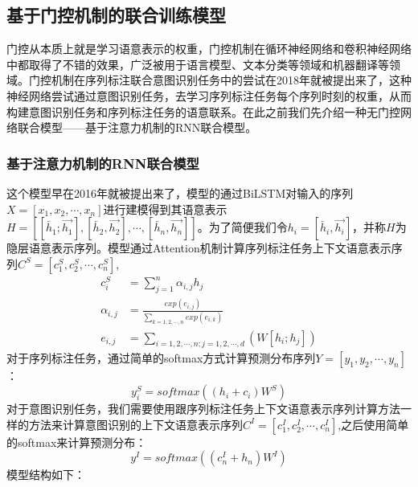 \documentclass[twoside,a4paper,12pt]{book}%
\begin{document}
\subsection{基于门控机制的联合训练模型}
门控从本质上就是学习语意表示的权重，门控机制在循环神经网络和卷积神经网络中都取得了不错的效果，广泛被用于语言模型、文本分类等领域和机器翻译等领域。门控机制在序列标注联合意图识别任务中的尝试在2018年就被提出来了，这种神经网络尝试通过意图识别任务，去学习序列标注任务每个序列时刻的权重，从而构建意图识别任务和序列标注任务的语意联系。在此之前我们先介绍一种无门控网络联合模型——基于注意力机制的RNN联合模型。
\subsubsection{基于注意力机制的RNN联合模型}
这个模型早在2016年就被提出来了，模型的通过BiLSTM对输入的序列$X=[x_1,x_2,\cdots,x_n]$进行建模得到其语意表示$H=[[\overleftarrow{h_1};\overrightarrow{h_1}],[\overleftarrow{h_2},\overrightarrow{h_2}],\cdots,[\overleftarrow{h_n},\overrightarrow{h_n}]]$。为了简便我们令$h_i=[\overleftarrow{h_i},\overrightarrow{h_i}]$，并称$H$为隐层语意表示序列。模型通过Attention机制计算序列标注任务上下文语意表示序列$C^S=[c^S_1,c^S_2,\cdots,c^S_n]$,
$$
\begin{aligned}
c_i^S&=\sum_{j=1}^{n}\alpha_{i,j}h_j\\
\alpha_{i,j}&=\frac{exp(e_{i,j})}{\sum_{k=1,2,\cdots,n}{exp(e_{i,k})}}\\
e_{i,j} &= \sum_{i=1,2,\cdots,n;j=1,2,\cdots,d}(W[h_i;h_j])
\end{aligned}
$$
对于序列标注任务，通过简单的softmax方式计算预测分布序列$Y=[y_1,y_2,\cdots,y_n]$：
$$
y^S_i=softmax((h_i+c_i)W^S)
$$
对于意图识别任务，我们需要使用跟序列标注任务上下文语意表示序列计算方法一样的方法来计算意图识别的上下文语意表示序列$C^I=[c^I_1,c^I_2,\cdots,c^I_n]$,之后使用简单的softmax来计算预测分布：
$$
y^I=softmax((c_n^I+h_n)W^I)
$$
模型结构如下：
\end{document}
